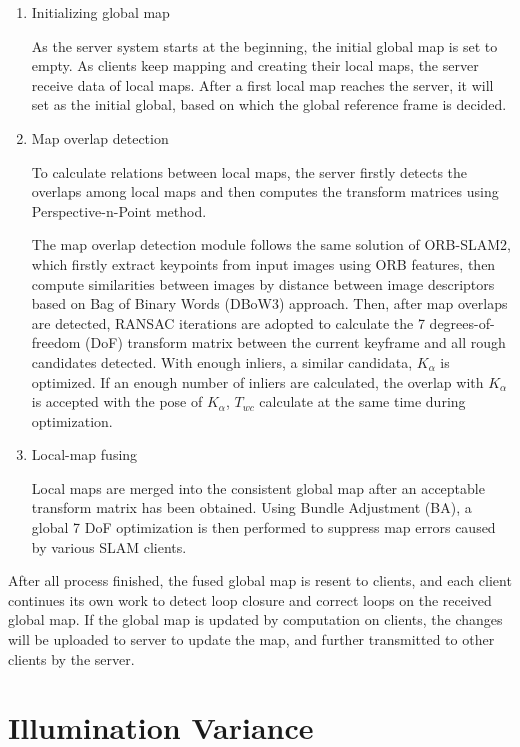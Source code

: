 \begin{enumerate}[1.]
	\item Initializing global map
	
	As the server system starts at the beginning, the initial global map is set to empty. As clients keep mapping and creating their local maps, the server receive data of local maps. After a first local map reaches the server, it will set as the initial global, based on which the global reference frame is decided.
	
	\item Map overlap detection
	
	To calculate relations between local maps, the server firstly detects the overlaps among local maps and then computes the transform matrices using Perspective-n-Point method.
	
	The map overlap detection module follows the same solution of ORB-SLAM2, which firstly extract keypoints from input images using ORB features, then compute similarities between images by distance between image descriptors based on Bag of Binary Words (DBoW3) approach.
	Then, after map overlaps are detected, RANSAC iterations are adopted to calculate the 7 degrees-of-freedom (DoF) transform matrix between the current keyframe and all rough candidates detected. With enough inliers, a similar candidata, $K_{\alpha}$ is optimized. If an enough number of inliers are calculated, the overlap with $K_\alpha$ is accepted with the pose of $K_\alpha$, $T_{wc}$ calculate at the same time during optimization.
	
	\item Local-map fusing 
	
	Local maps are merged into the consistent global map after an acceptable transform matrix has been obtained. Using Bundle Adjustment (BA), a global 7 DoF optimization is then performed to suppress map errors caused by various SLAM clients.
\end{enumerate}

After all process finished, the fused global map is resent to clients, and each client continues its own work to detect loop closure and correct loops on the received global map. If the global map is updated by computation on clients, the changes will be uploaded to server to update the map, and further transmitted to other clients by the server.

\section{Illumination Variance}

